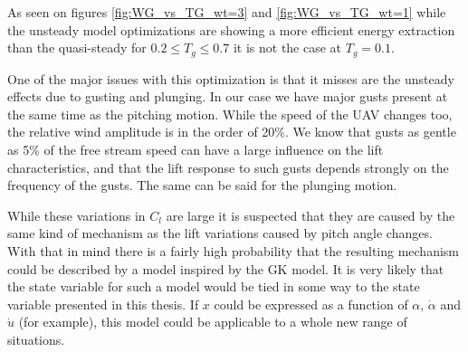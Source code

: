 \par As seen on figures \ref{fig:WG_vs_TG_wt=3} and \ref{fig:WG_vs_TG_wt=1} while the unsteady model optimizations are showing a more efficient energy extraction than the quasi-steady for $0.2 \leq T_g \leq 0.7$ it is not the case at $T_g=0.1$. 



One of the major issues with this optimization is that it misses are the unsteady effects due to gusting and plunging.
In our case we have major gusts present at the same time as the pitching motion.
While the speed of the UAV changes too, the relative wind amplitude is in the order of 20\%.
We know that gusts as gentle as 5\% of the free stream speed can have a large influence on the lift characteristics, and that the lift response to such gusts depends strongly on the frequency of the gusts.
The same can be said for the plunging motion.

\par While these variations in $C_l$ are large it is suspected that they are caused by the same kind of mechanism as the lift variations caused by pitch angle changes.
With that in mind there is a fairly high probability that the resulting mechanism could be described by a model inspired by the GK model.
It is very likely that the state variable for such a model would be tied in some way to the state variable presented in this thesis.
If $x$ could be expressed as a function of $\alpha$, $\dot{\alpha}$ and $\dot{u}$ (for example), this model could be applicable to a whole new range of situations.


